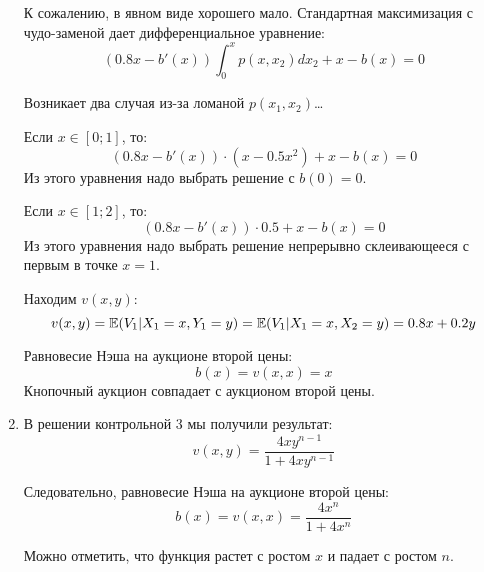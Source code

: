 \begin{enumerate}


К сожалению, в явном виде хорошего мало. Стандартная максимизация с чудо-заменой дает дифференциальное уравнение:
\begin{equation}
(0.8x-b'(x))\int_{0}^{x}p(x,x_{2})dx_{2}+x-b(x)=0
\end{equation}

Возникает два случая из-за ломаной $ p(x_{1},x_{2}) $\ldots

Если $ x\in [0;1] $, то:
\begin{equation}
(0.8x-b'(x))\cdot (x-0.5x^{2})+x-b(x)=0
\end{equation}
Из этого уравнения надо выбрать решение с $ b(0)=0 $.

Если $ x\in [1;2] $, то:
\begin{equation}
(0.8x-b'(x))\cdot 0.5+x-b(x)=0
\end{equation}
Из этого уравнения надо выбрать решение непрерывно склеивающееся с первым в точке $x=1$.


Находим $ v(x,y) $:
\begin{equation}
v(x,y)=\mathbb{E}(V_{1}|X_{1}=x,Y_{1}=y)=\mathbb{E}(V_{1}|X_{1}=x,X_{2}=y)=0.8x+0.2y
\end{equation}

Равновесие Нэша на аукционе второй цены:
\begin{equation}
b(x)=v(x,x)=x
\end{equation}
Кнопочный аукцион совпадает с аукционом второй цены.


\item В решении контрольной 3 мы получили результат:
\begin{equation}
v(x,y)=\frac{4xy^{n-1}}{1+4xy^{n-1}}
\end{equation}

Следовательно, равновесие Нэша на аукционе второй цены:
\begin{equation}
b(x)=v(x,x)=\frac{4x^{n}}{1+4x^{n}}
\end{equation}

Можно отметить, что функция растет с ростом $ x $ и падает с ростом $ n $.


\end{enumerate}
